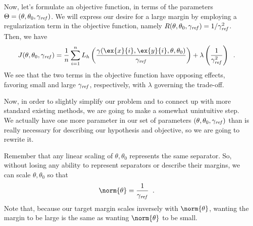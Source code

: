 Now, let's formulate an objective function, in terms of the parameters
$\Theta = (\theta, \theta_0, \gamma_{\it ref})$.  
We will express our desire for a large margin by employing a regularization 
term in the objective function, namely
$R(\theta,\theta_0, \gamma_{\it ref}) = 1/\gamma_{\it 
    ref}^2$. 
Then, we have 
\[
  J(\theta,\theta_0,\gamma_{\it ref}) = \frac{1}{n}\sum_{i=1}^n
  L_h\left(\frac{\gamma(\ex{x}{i},\ex{y}{i},\theta,\theta_0)}{\gamma_{\it ref}}
  \right) + \lambda\left(\frac{1}{\gamma_{\it ref}^2}\right)\;\;.
\]
We see that the two terms in the objective function have opposing
effects, favoring small and large $\gamma_{\it ref}$, respectively,
with $\lambda$   governing
the trade-off.  

Now, in order to slightly simplify our problem and to connect up with
more standard existing methods, we are going to make a somewhat
unintuitive step.  
We actually have one more parameter in our set of parameters
$(\theta, \theta_0, \gamma_{\it ref})$ than is really necessary for
describing our hypothesis and objective, so we are going to rewrite it.

Remember that any linear scaling of $\theta,\theta_0$
represents the same separator.  So, without losing any ability to
represent separators or describe their margins, 
we can scale $\theta, \theta_0$ so that 
\[ \norm{\theta} = \frac{1}{\gamma_{\it ref}}\;\;. \]
Note that, because our target margin scales inversely with
$\norm{\theta}$, wanting the margin to be large is the same as wanting
$\norm{\theta}$ to be small.

